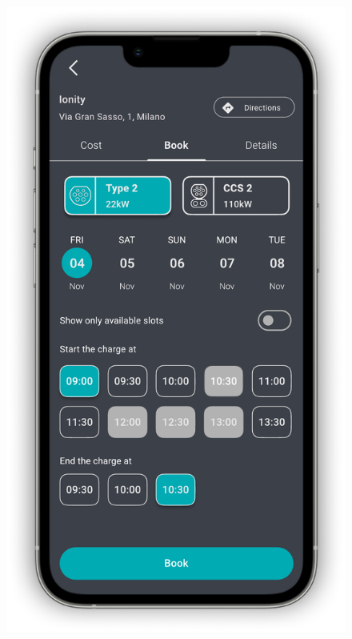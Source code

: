 \begin{figure}[H]
{        \includegraphics[scale=0.32,page=1]{src/mockups/book_charge.pdf}
    }
\end{figure}
